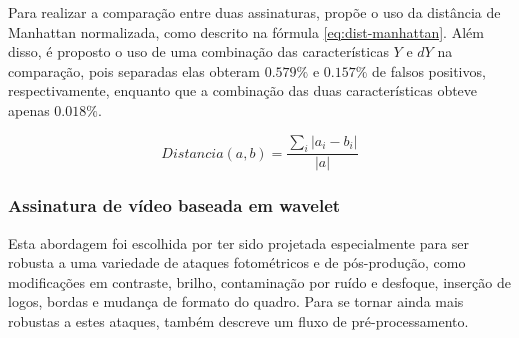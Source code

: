 Para realizar a comparação entre duas assinaturas, \citeauthor{cook2011efficient} propõe o uso da distância de Manhattan normalizada, como descrito na fórmula \ref{eq:dist-manhattan}. Além disso, é proposto o uso de uma combinação das características $Y$ e $dY$ na comparação, pois separadas elas obteram $0.579\%$ e $0.157\%$ de falsos positivos, respectivamente, enquanto que a combinação das duas características obteve apenas $0.018\%$. 

\begin{equation}
  Distancia(a,b) = \frac{\sum_i|a_i - b_i|}{|a|}
  \label{eq:dist-manhattan}
\end{equation}


    

    
%
%

\subsubsection{Assinatura de vídeo baseada em wavelet}

Esta abordagem foi escolhida por ter sido projetada especialmente para ser robusta a uma variedade de ataques fotométricos e de pós-produção, como modificações em contraste, brilho, contaminação por ruído e desfoque, inserção de logos, bordas e mudança de formato do quadro. Para se tornar ainda mais robustas a estes ataques, \citeauthor{Dutta2013} também descreve um fluxo de pré-processamento.

